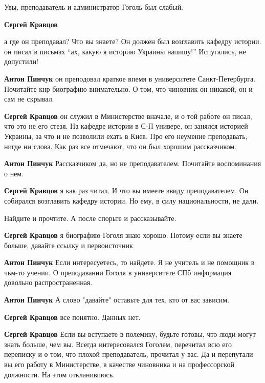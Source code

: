 \begin{itemize}
\begin{itemize} %
Увы, преподаватель и администратор Гоголь был слабый.

\begin{itemize} %
\textbf{Сергей Кравцов} 

а где он преподавал? Что вы знаете? Он должен был возглавить кафедру истории.
он писал в письмах \enquote{ах, какую я историю Украины напишу!} Испугались, не
допустили!

\textbf{Антон Пинчук} он преподовал краткое впемя в университете Санкт-Петербурга. Почитайте кнр биографию внимательно. О том, что чиновник он никакой, он и сам не скрывал.

\textbf{Сергей Кравцов} он служил в Министерстве вначале, и о той работе он писал, что это не его стезя. На кафедре истории в С-П универе, он занялся историей Украины, за что и не позволили ехать в Киев. Про его неумение преподавать, нигде ни слова. Как раз все отмечают, что он был хорошим рассказчиком.

\textbf{Антон Пинчук} Рассказчиком да, но не преподавателем. Почитайте воспоминания о нем.

\textbf{Сергей Кравцов} я как раз читал. И что вы имеете ввиду преподавателем. Он собирался возглавить кафедру истории. Но ему, в силу национальности, не дали.

Найдите и прочтите. А после спорьте и рассказывайте.

\textbf{Сергей Кравцов} я биографию Гоголя знаю хорошо. Потому если вы знаете больше, давайте ссылку и первоисточник

\textbf{Антон Пинчук} Если интересуетесь, то найдете. Я не учитель и не помощник в чьм-то учении. О преподавании Гоголя в университете СПб информация довольно распространенная.

\textbf{Антон Пинчук} А слово "давайте" оставьте для тех, кто от вас зависим.

\textbf{Сергей Кравцов} все понятно. Данных нет.

\textbf{Сергей Кравцов} Если вы вступаете в полемику, будьте готовы, что люди могут знать больше, чем вы. Всегда интересовался Гоголем, перечитал всю его переписку и о том, что плохой преподаватель, прочитал у вас. Да и перепутали вы его работу в Министерстве, в качестве чиновника и на профессорской должности. На этом откланивпюсь.


\end{itemize}
\end{itemize}
\end{itemize}

